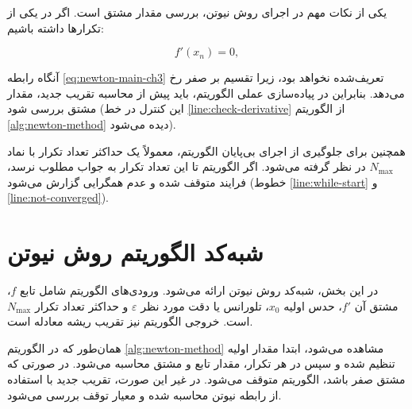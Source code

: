 یکی از نکات مهم در اجرای روش نیوتن، بررسی مقدار مشتق است. اگر در یکی از تکرارها داشته باشیم:

\begin{equation}
f'(x_n)=0,
\label{eq:zero-derivative-ch3}
\end{equation}

آنگاه رابطه \eqref{eq:newton-main-ch3} تعریف‌شده نخواهد بود، زیرا تقسیم بر صفر رخ می‌دهد. بنابراین در پیاده‌سازی عملی الگوریتم، باید پیش از محاسبه تقریب جدید، مقدار مشتق بررسی شود (این کنترل در خط \ref{line:check-derivative} از الگوریتم \ref{alg:newton-method} دیده می‌شود).

همچنین برای جلوگیری از اجرای بی‌پایان الگوریتم، معمولاً یک حداکثر تعداد تکرار با نماد \(N_{\max}\) در نظر گرفته می‌شود. اگر الگوریتم تا این تعداد تکرار به جواب مطلوب نرسد، فرایند متوقف شده و عدم همگرایی گزارش می‌شود (خطوط \ref{line:while-start} و \ref{line:not-converged}).

\section{شبه‌کد الگوریتم روش نیوتن}
\label{sec:pseudo}

در این بخش، شبه‌کد روش نیوتن ارائه می‌شود. ورودی‌های الگوریتم شامل تابع \(f\)، مشتق آن \(f'\)، حدس اولیه \(x_0\)، تلورانس یا دقت مورد نظر \(\varepsilon\) و حداکثر تعداد تکرار \(N_{\max}\) است. خروجی الگوریتم نیز تقریب ریشه معادله است.

همان‌طور که در الگوریتم \ref{alg:newton-method} مشاهده می‌شود، ابتدا مقدار اولیه تنظیم شده و سپس در هر تکرار، مقدار تابع و مشتق محاسبه می‌شود. در صورتی که مشتق صفر باشد، الگوریتم متوقف می‌شود. در غیر این صورت، تقریب جدید با استفاده از رابطه نیوتن محاسبه شده و معیار توقف بررسی می‌شود.

